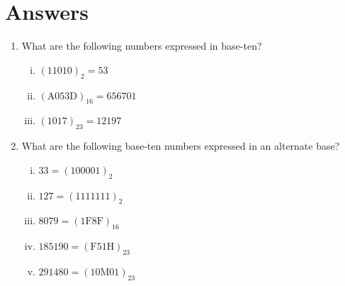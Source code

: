 \documentclass{article}
\begin{document}
\section*{Answers}
\begin{enumerate}
\item What are the following numbers expressed in base-ten?
\begin{enumerate}[i)]
\item $(11010)_2 = 53$
\item $(\text{A}053\text{D})_{16}=656701$
\item $(1017)_{23} = 12197$
\end{enumerate}
\item What are the following base-ten numbers expressed in an alternate base?
\begin{enumerate}[i)]
\item $33 = (100001)_2$
\item $127 = (1111111)_2$
\item $8079 = (1\text{F}8\text{F})_{16}$
\item $185190 = (\text{F}51\text{H})_{23}$
\item $291480 = (10\text{M}01)_{23}$
\end{enumerate}
\end{enumerate}
\end{document}
